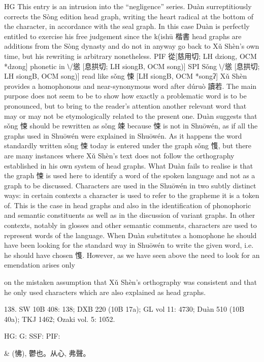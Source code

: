 HG This entry is an intrusion into the ``negligence'' series.
    Duàn surreptitiously corrects the Sòng edition head graph, writing the heart radical at the bottom of the character, in accordance with the seal graph. In this case Duàn is perfectly entitled to exercise his free judgement since the k(ishū 楷書 head graphs are additions from the Sòng dynasty and do not in anyway go back to Xǔ Shèn's own time, but his rewriting is arbitrary nonetheless.
PIF    從[慈用切; LH dziong, OCM *dzong] phonetic in ⧵/慫 [息拱切; LH siongB, OCM song)]
SPI     Sǒng ⧵/慫 [息拱切; LH siongB, OCM song)] read like sǒng 悚 [LH siongB, OCM *songʔ]
    Xǔ Shèn provides a homophonous and near-synonymous word after dúruò 讀若. The main purpose does not seem to be to show how exactly a problematic word is to be pronounced, but to bring to the reader's attention another relevant word that may or may not be etymologically related to the present one.
    Duàn suggests that sǒng 悚 should be rewritten as sǒng 竦 because 悚 is not in Shuōwén, as if all the graphs used in Shuōwén were explained in Shuōwén. As it happens the word standardly written sǒng 悚 today is entered under the graph sǒng 愯, but there are many instances where Xǔ Shèn's text does not follow the orthography established in his own system of head graphs. What Duàn fails to realise is that the graph 悚 is used here to identify a word of the spoken language and not as a graph to be discussed. Characters are used in the Shuōwén in two subtly distinct ways: in certain contexts a character is used to refer to the grapheme it is a token of. This is the case in head graphs and also in the identification of phonophoric and semantic constituents as well as in the discussion of variant graphs. In other contexts, notably in glosses and other semantic comments, characters are used to represent words of the language. When Duàn substitutes a homophone he should have been looking for the standard way in Shuōwén to write the given word, i.e. he should have chosen 愯. However, as we have seen above the need to look for an emendation arises only




on the mistaken assumption that Xǔ Shèn's orthography was consistent and that he only used characters which are also explained as head graphs.

138. SW 10B 408: 138; DXB 220 (10B 17a); GL vol 11: 4730; Duàn 510 (10B 40a); TKJ 1462; Ozaki vol. 5: 1052.


HG:
G: SSF: PIF:

& (怫), 鬱也。从心,
弗聲。


